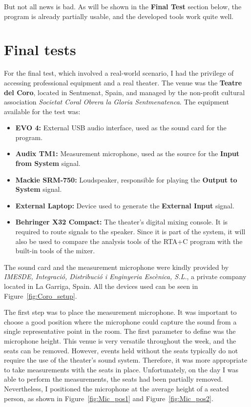 But not all news is bad. As will be shown in the \textbf{Final Test} section below, the program is already partially usable, and the developed tools work quite well.

\section{Final tests}

For the final test, which involved a real-world scenario, I had the privilege of accessing professional equipment and a real theater. The venue was the \textbf{Teatre del Coro}, located in Sentmenat, Spain, and managed by the non-profit cultural association \textit{Societat Coral Obrera la Gloria Sentmenatenca}. The equipment available for the test was:

\begin{itemize}
	\item \textbf{EVO 4:} External USB audio interface, used as the sound card for the program.
	\item \textbf{Audix TM1:} Measurement microphone, used as the source for the \textbf{Input from System} signal.
	\item \textbf{Mackie SRM-750:} Loudspeaker, responsible for playing the \textbf{Output to System} signal.
	\item \textbf{External Laptop:} Device used to generate the \textbf{External Input} signal.
	\item \textbf{Behringer X32 Compact:} The theater's digital mixing console. It is required to route signals to the speaker. Since it is part of the system, it will also be used to compare the analysis tools of the RTA+C program with the built-in tools of the mixer.
\end{itemize}

The sound card and the measurement microphone were kindly provided by \textit{IMESDE, Integració, Distribució i Enginyeria Escènica, S.L.}, a private company located in La Garriga, Spain. All the devices used can be seen in Figure~\ref{fig:Coro_setup}.

The first step was to place the measurement microphone. It was important to choose a good position where the microphone could capture the sound from a single representative point in the room. The first parameter to define was the microphone height. This venue is very versatile throughout the week, and the seats can be removed. However, events held without the seats typically do not require the use of the theater's sound system. Therefore, it was more appropriate to take measurements with the seats in place. Unfortunately, on the day I was able to perform the measurements, the seats had been partially removed. Nevertheless, I positioned the microphone at the average height of a seated person, as shown in Figure~\ref{fig:Mic_pos1} and Figure~\ref{fig:Mic_pos2}.

